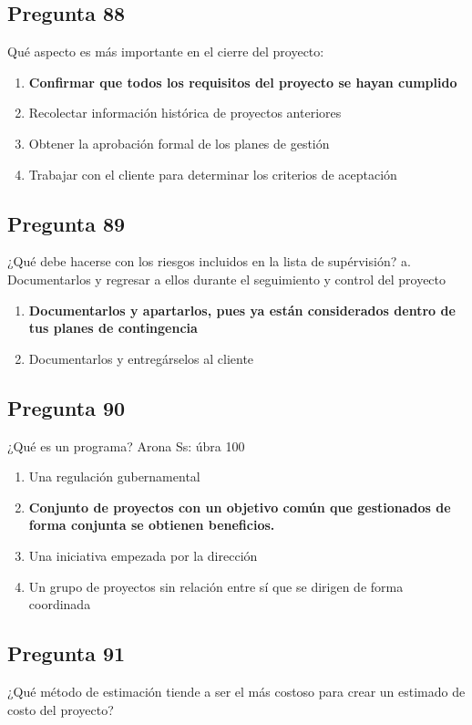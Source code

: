 \documentclass[11pt,a4paper]{article}
\begin{document}
\subsection*{Pregunta 88}
Qué aspecto es más importante en el cierre del proyecto:

\begin{enumerate}[label=\alph*)]
  \item \textbf{Confirmar que todos los requisitos del proyecto se hayan cumplido}
  \item Recolectar información histórica de proyectos anteriores
  \item Obtener la aprobación formal de los planes de gestión
  \item Trabajar con el cliente para determinar los criterios de aceptación
\end{enumerate}

\subsection*{Pregunta 89}
¿Qué debe hacerse con los riesgos incluidos en la lista de supérvisión? a. Documentarlos y regresar a ellos durante el seguimiento y control del proyecto

\begin{enumerate}[label=\alph*)]
  \item \textbf{Documentarlos y apartarlos, pues ya están considerados dentro de tus planes de contingencia}
  \item Documentarlos y entregárselos al cliente
\end{enumerate}

\subsection*{Pregunta 90}
¿Qué es un programa? Arona Ss: úbra 100

\begin{enumerate}[label=\alph*)]
  \item Una regulación gubernamental
  \item \textbf{Conjunto de proyectos con un objetivo común que gestionados de forma conjunta se obtienen beneficios.}
  \item Una iniciativa empezada por la dirección
  \item Un grupo de proyectos sin relación entre sí que se dirigen de forma coordinada
\end{enumerate}

\subsection*{Pregunta 91}
¿Qué método de estimación tiende a ser el más costoso para crear un estimado de costo del proyecto?
\end{document}
